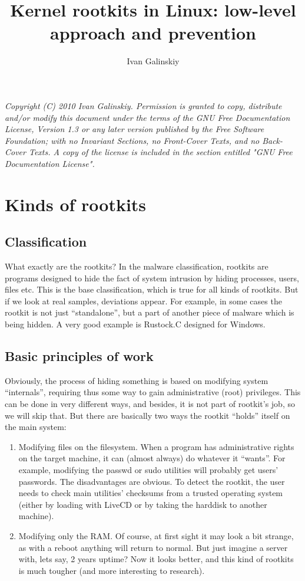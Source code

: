 \documentclass[12pt]{book}
\title{Kernel rootkits in Linux: low-level approach and prevention}
\date{}
\author{Ivan Galinskiy}
\begin{document}
\maketitle
\newpage
  \emph{
  Copyright (C) 2010 Ivan Galinskiy.
    Permission is granted to copy, distribute and/or modify this document
    under the terms of the GNU Free Documentation License, Version 1.3
    or any later version published by the Free Software Foundation;
    with no Invariant Sections, no Front-Cover Texts, and no Back-Cover Texts.
    A copy of the license is included in the section entitled "GNU
    Free Documentation License".}
  \newpage
  
  \section{Kinds of rootkits}
  \subsection{Classification}
  What exactly are the rootkits? In the malware classification, rootkits are
  programs designed to hide the fact of system intrusion by hiding processes,
  users, files etc. This is the base classification, which is true for all
  kinds of rootkits. But if we look at real samples, deviations appear. For
  example, in some cases the rootkit is not just ``standalone'', but a part of
  another piece of malware which is being hidden. A very good example is
  Rustock.C designed for Windows.

  \subsection{Basic principles of work}
  Obviously, the process of hiding something is based on modifying system
  ``internals'', requiring thus some way to gain administrative (root)
  privileges. This can be done in very different ways, and besides, it is not
  part of rootkit's job, so we will skip that. But there are basically two
  ways the rootkit ``holds'' itself on the main system:
  \begin{enumerate}
    \item Modifying files on the filesystem. When a program has administrative
      rights on the target machine, it can (almost always) do whatever it
      ``wants''. For example, modifying the passwd or sudo utilities will
      probably get users' passwords. The disadvantages are obvious. To detect
      the rootkit, the user needs to check main utilities' checksums from a
      trusted operating system (either by loading with LiveCD or by taking the
      harddisk to another machine).

    \item Modifying only the RAM. Of course, at first sight it may look a bit
      strange, as with a reboot anything will return to normal. But just
      imagine a server with, lets say, 2 years uptime? Now it looks better,
      and this kind of rootkits is much tougher (and more interesting to
      research).
  \end{enumerate}
\end{document}
